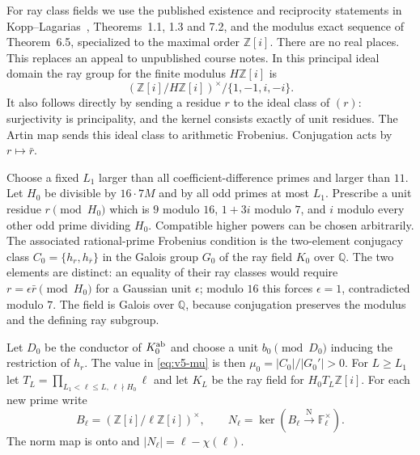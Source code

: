 For ray class fields we use the published existence and reciprocity
statements in Kopp--Lagarias~\cite{v5kl}, Theorems~1.1, 1.3 and 7.2,
and the modulus exact sequence of Theorem~6.5, specialized to the maximal
order $\mathbb Z[i]$. There are no real places. This replaces an appeal
to unpublished course notes. In this principal ideal domain the ray group
for the finite modulus $H\mathbb Z[i]$ is
\begin{equation}\label{eq:v5-ray-group}
 (\mathbb Z[i]/H\mathbb Z[i])^\times/\{1,-1,i,-i\}.
\end{equation}
It also follows directly by sending a residue $r$ to the ideal class of
$(r)$: surjectivity is principality, and the kernel consists exactly of
unit residues. The Artin map sends this ideal class to arithmetic
Frobenius. Conjugation acts by $r\mapsto\bar r$.

Choose a fixed $L_1$ larger than all coefficient-difference primes and
larger than $11$. Let $H_0$ be divisible by $16\cdot7M$ and by all odd
primes at most $L_1$. Prescribe a unit residue $r\pmod{H_0}$ which is
$9$ modulo $16$, $1+3i$ modulo $7$, and $i$ modulo every other odd
prime dividing $H_0$. Compatible higher powers can be chosen arbitrarily.
The associated rational-prime Frobenius condition is the two-element
conjugacy class $C_0=\{h_r,h_{\bar r}\}$ in the Galois group $G_0$ of
the ray field $K_0$ over $\mathbb Q$.
The two elements are distinct: an equality of their ray classes would
require $r=\epsilon\bar r\pmod{H_0}$ for a Gaussian unit $\epsilon$;
modulo $16$ this forces $\epsilon=1$, contradicted modulo $7$.
The field is Galois over $\mathbb Q$, because conjugation preserves the
modulus and the defining ray subgroup.

Let $D_0$ be the conductor of $K_0^{\rm ab}$ and choose a unit
$b_0\pmod{D_0}$ inducing the restriction of $h_r$.
The value in \eqref{eq:v5-mu} is then
$\mu_0=|C_0|/|G_0'|>0$.
For $L\geq L_1$ let
$T_L=\prod_{L_1<\ell\leq L,\,\ell\nmid H_0}\ell$ and let $K_L$ be the
ray field for $H_0T_L\mathbb Z[i]$. For each new prime write
\[
 B_\ell=(\mathbb Z[i]/\ell\mathbb Z[i])^\times,
 \qquad N_\ell=\ker(B_\ell\xrightarrow{\mathrm N}\mathbb F_\ell^\times).
\]
The norm map is onto and $|N_\ell|=\ell-\chi(\ell)$.

